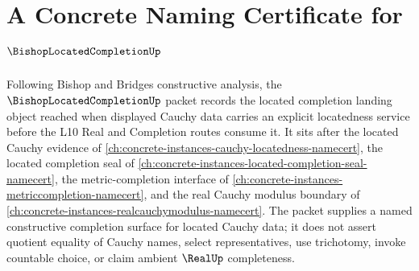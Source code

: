 \chapter{A Concrete Naming Certificate for $\BishopLocatedCompletionUp$}
\label{ch:concrete-instances-bishop-located-completion-namecert}

Following Bishop and Bridges constructive analysis, the $\BishopLocatedCompletionUp$ packet records the located completion landing object reached when displayed Cauchy data carries an explicit locatedness service before the L10 Real and Completion routes consume it. It sits after the located Cauchy evidence of \autoref{ch:concrete-instances-cauchy-locatedness-namecert}, the located completion seal of \autoref{ch:concrete-instances-located-completion-seal-namecert}, the metric-completion interface of \autoref{ch:concrete-instances-metriccompletion-namecert}, and the real Cauchy modulus boundary of \autoref{ch:concrete-instances-realcauchymodulus-namecert}. The packet supplies a named constructive completion surface for located Cauchy data; it does not assert quotient equality of Cauchy names, select representatives, use trichotomy, invoke countable choice, or claim ambient $\RealUp$ completeness.

